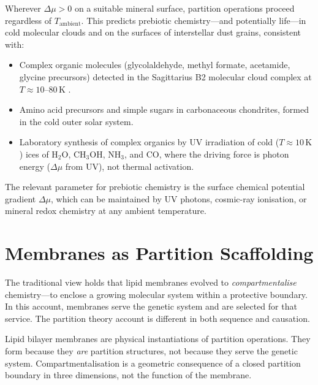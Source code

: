 \begin{corollary}
\label{cor:low_temp_abiogenesis}
Wherever $\Delta\mu > 0$ on a suitable mineral surface, partition operations
proceed regardless of $T_{\mathrm{ambient}}$. This predicts prebiotic
chemistry---and potentially life---in cold molecular clouds and on the surfaces
of interstellar dust grains, consistent with:
\begin{itemize}
  \item Complex organic molecules (glycolaldehyde, methyl formate, acetamide,
        glycine precursors) detected in the Sagittarius B2 molecular cloud
        complex at $T \approx 10$--$80\,\mathrm{K}$ \citep{belloche2008,hollis2000}.
  \item Amino acid precursors and simple sugars in carbonaceous chondrites,
        formed in the cold outer solar system.
  \item Laboratory synthesis of complex organics by UV irradiation of cold
        ($T \approx 10\,\mathrm{K}$) ices of H$_2$O, CH$_3$OH, NH$_3$, and CO,
        where the driving force is photon energy ($\Delta\mu$ from UV), not
        thermal activation.
\end{itemize}
The relevant parameter for prebiotic chemistry is the surface chemical potential
gradient $\Delta\mu$, which can be maintained by UV photons, cosmic-ray
ionisation, or mineral redox chemistry at any ambient temperature.
\end{corollary}

\section{Membranes as Partition Scaffolding}
\label{sec:membranes_partition}

The traditional view holds that lipid membranes evolved to \emph{compartmentalise}
chemistry---to enclose a growing molecular system within a protective boundary.
In this account, membranes serve the genetic system and are selected for that
service. The partition theory account is different in both sequence and causation.

\begin{theorem}
\label{thm:membranes_partition}
Lipid bilayer membranes are physical instantiations of partition operations.
They form because they \emph{are} partition structures, not because they serve
the genetic system. Compartmentalisation is a geometric consequence of a closed
partition boundary in three dimensions, not the function of the membrane.
\end{theorem}

